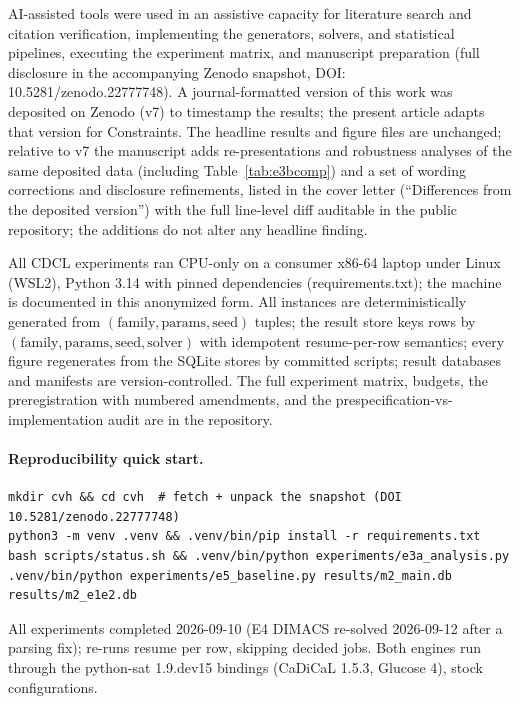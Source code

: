 \documentclass[pdflatex,sn-basic,Numbered]{sn-jnl}
\begin{document}
AI-assisted tools were used in an assistive capacity for literature search
and citation verification, implementing the generators, solvers, and
statistical pipelines, executing the experiment matrix, and manuscript
preparation (full disclosure in the accompanying Zenodo snapshot, DOI:
10.5281/zenodo.22777748).
A journal-formatted version of this work was deposited on Zenodo (v7) to
timestamp the results; the present article adapts that version for
Constraints. The headline results and figure files are unchanged; relative
to v7 the manuscript adds re-presentations and robustness analyses of the
same deposited data (including Table~\ref{tab:e3bcomp}) and a set of
wording corrections and disclosure refinements, listed in the cover letter
(``Differences from the deposited version'') with the full line-level diff
auditable in the public repository; the additions do not alter any headline
finding.

All CDCL experiments ran CPU-only on a consumer x86-64 laptop under Linux
(WSL2), Python 3.14 with pinned dependencies (requirements.txt); the machine
is documented in this anonymized form.
All instances are deterministically generated from
$(\text{family}, \text{params}, \text{seed})$ tuples; the result store keys
rows by $(\text{family}, \text{params}, \text{seed}, \text{solver})$ with
idempotent resume-per-row semantics; every figure regenerates from the SQLite
stores by committed scripts; result databases and manifests are
version-controlled. The full experiment matrix, budgets, the preregistration
with numbered amendments, and the prespecification-vs-implementation audit are
in the repository.

\paragraph{Reproducibility quick start.}
{\footnotesize
\begin{verbatim}
mkdir cvh && cd cvh  # fetch + unpack the snapshot (DOI 10.5281/zenodo.22777748)
python3 -m venv .venv && .venv/bin/pip install -r requirements.txt
bash scripts/status.sh && .venv/bin/python experiments/e3a_analysis.py
.venv/bin/python experiments/e5_baseline.py results/m2_main.db results/m2_e1e2.db
\end{verbatim}
}
All experiments completed 2026-09-10 (E4 DIMACS re-solved 2026-09-12 after a
parsing fix); re-runs resume per row, skipping decided jobs. Both engines run
through the python-sat 1.9.dev15 bindings (CaDiCaL 1.5.3, Glucose 4), stock
configurations.
\end{document}

